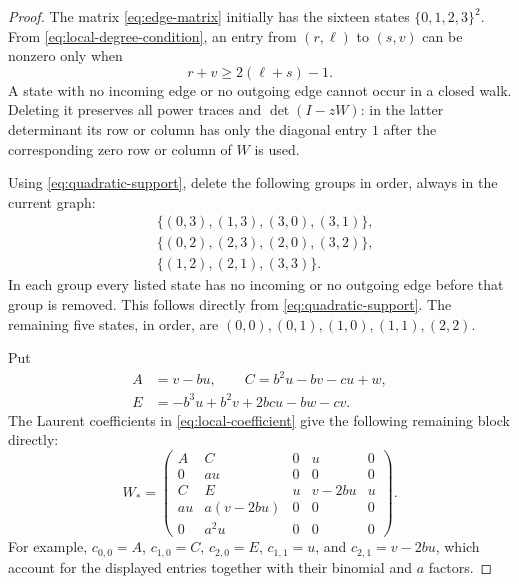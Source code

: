 \begin{proof}
The matrix \eqref{eq:edge-matrix} initially has the sixteen states
$\{0,1,2,3\}^2$. From \eqref{eq:local-degree-condition}, an entry
from $(r,\ell)$ to $(s,v)$ can be nonzero only when
\begin{equation}\label{eq:quadratic-support}
 r+v\ge2(\ell+s)-1.
\end{equation}
A state with no incoming edge or no outgoing edge cannot occur in a
closed walk. Deleting it preserves all power traces and
$\det(I-zW)$: in the latter determinant its row or column has only
the diagonal entry $1$ after the corresponding zero row or column
of $W$ is used.

Using \eqref{eq:quadratic-support}, delete the following groups in
order, always in the current graph:
\begin{align*}
 &\{(0,3),(1,3),(3,0),(3,1)\},\\
 &\{(0,2),(2,3),(2,0),(3,2)\},\\
 &\{(1,2),(2,1),(3,3)\}.
\end{align*}
In each group every listed state has no incoming or no outgoing
edge before that group is removed. This follows directly from
\eqref{eq:quadratic-support}. The remaining five states, in order,
are $(0,0),(0,1),(1,0),(1,1),(2,2)$.

Put
\begin{equation}\label{eq:quadratic-shorthand}
 \begin{split}
 A&=v-bu,\qquad C=b^2u-bv-cu+w,\\
 E&=-b^3u+b^2v+2bcu-bw-cv.
 \end{split}
\end{equation}
The Laurent coefficients in \eqref{eq:local-coefficient} give the
following remaining block directly:
\begin{equation}\label{eq:five-state}
 W_*=
 \begin{pmatrix}
 A&C&0&u&0\\
 0&au&0&0&0\\
 C&E&u&v-2bu&u\\
 au&a(v-2bu)&0&0&0\\
 0&a^2u&0&0&0
 \end{pmatrix}.
\end{equation}
For example, $c_{0,0}=A$, $c_{1,0}=C$, $c_{2,0}=E$,
$c_{1,1}=u$, and $c_{2,1}=v-2bu$, which account for the displayed
entries together with their binomial and $a$ factors.


\end{proof}
